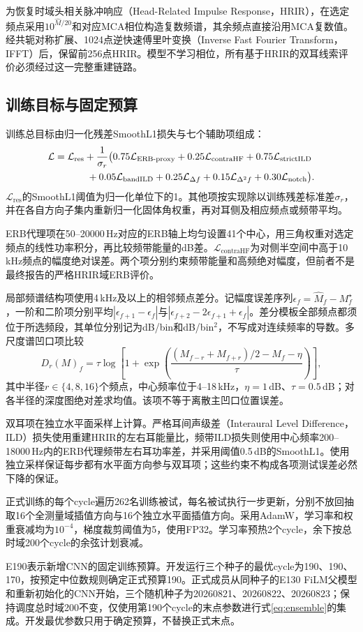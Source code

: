 为恢复时域头相关脉冲响应（Head-Related Impulse Response，HRIR），在选定频点采用$10^{\widehat M/20}$和对应MCA相位构造复数频谱，其余频点直接沿用MCA复数值。经共轭对称扩展、1024点逆快速傅里叶变换（Inverse Fast Fourier Transform，IFFT）后，保留前256点HRIR。模型不学习相位，所有基于HRIR的双耳线索评价必须经过这一完整重建链路。

\subsection{训练目标与固定预算}
训练总目标由归一化残差SmoothL1损失与七个辅助项组成：
\begin{align}
\mathcal L={}&\mathcal L_{\mathrm{res}}+
\frac{1}{\sigma_r}\big(
0.75\mathcal L_{\mathrm{ERB\text{-}proxy}}+
0.25\mathcal L_{\mathrm{contraHF}}+
0.75\mathcal L_{\mathrm{strictILD}}\notag\\
&\qquad+
0.05\mathcal L_{\mathrm{bandILD}}+
0.25\mathcal L_{\Delta f}+
0.15\mathcal L_{\Delta^2 f}+
0.30\mathcal L_{\mathrm{notch}}\big).
\label{eq:training-loss}
\end{align}
$\mathcal L_{\mathrm{res}}$的SmoothL1阈值为归一化单位下的1。其他项按实现除以训练残差标准差$\sigma_r$，并在各自方向子集内重新归一化固体角权重，再对耳侧及相应频点或频带平均。

ERB代理项在50--20000\,Hz对应的ERB轴上均匀设置41个中心，用三角权重对选定频点的线性功率积分，再比较频带能量的dB差。$\mathcal L_{\mathrm{contraHF}}$为对侧半空间中高于10\,kHz频点的幅度绝对误差。两个项分别约束频带能量和高频绝对幅度，但前者不是最终报告的严格HRIR域ERB评价。

局部频谱结构项使用4\,kHz及以上的相邻频点差分。记幅度误差序列$\epsilon_f=\widehat M_f-M^\star_f$，一阶和二阶项分别平均$|\epsilon_{f+1}-\epsilon_f|$与$|\epsilon_{f+2}-2\epsilon_{f+1}+\epsilon_f|$。差分模板全部频点都须位于所选频段，其单位分别记为dB/bin和dB/bin$^2$，不写成对连续频率的导数。多尺度谱凹口项比较
\begin{equation}
D_r(M)_f=\tau\log\!\left[
1+\exp\!\left(
\frac{(M_{f-r}+M_{f+r})/2-M_f-\eta}{\tau}
\right)\right],
\end{equation}
其中半径$r\in\{4,8,16\}$个频点，中心频率位于4--18\,kHz，$\eta=1$\,dB、$\tau=0.5$\,dB；对各半径的深度图绝对差求均值。该项不等于离散主凹口位置误差。

双耳项在独立水平面采样上计算。严格耳间声级差（Interaural Level Difference，ILD）损失使用重建HRIR的左右耳能量比，频带ILD损失则使用中心频率200--18000\,Hz内的ERB代理频带左右耳功率差，并采用阈值0.5\,dB的SmoothL1。使用独立采样保证每步都有水平面方向参与双耳项；这些约束不构成各项测试误差必然下降的保证。

正式训练的每个cycle遍历262名训练被试，每名被试执行一步更新，分别不放回抽取16个全测量域插值方向与16个独立水平面插值方向。采用AdamW，学习率和权重衰减均为$10^{-4}$，梯度裁剪阈值为5，使用FP32。学习率预热2个cycle，余下按总时域200个cycle的余弦计划衰减。

E190表示新增CNN的固定训练预算。开发运行三个种子的最优cycle为190、190、170，按预定中位数规则确定正式预算190。正式成员从同种子的E130 FiLM父模型和重新初始化的CNN开始，三个随机种子为20260821、20260822、20260823；保持调度总时域200不变，仅使用第190个cycle的末点参数进行式\eqref{eq:ensemble}的集成。开发最优参数只用于确定预算，不替换正式末点。
